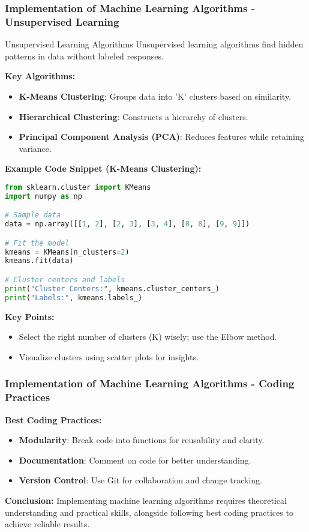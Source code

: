 \documentclass[aspectratio=169]{beamer}
\begin{document}
\begin{frame}[fragile]
    \frametitle{Implementation of Machine Learning Algorithms - Unsupervised Learning}
    \begin{block}{Unsupervised Learning Algorithms}
        Unsupervised learning algorithms find hidden patterns in data without labeled responses.
    \end{block}
    
    \textbf{Key Algorithms:}
    \begin{itemize}
        \item \textbf{K-Means Clustering}: Groups data into 'K' clusters based on similarity.
        \item \textbf{Hierarchical Clustering}: Constructs a hierarchy of clusters.
        \item \textbf{Principal Component Analysis (PCA)}: Reduces features while retaining variance.
    \end{itemize}
    
    \textbf{Example Code Snippet (K-Means Clustering):}
    \begin{lstlisting}[language=Python]
from sklearn.cluster import KMeans
import numpy as np

# Sample data
data = np.array([[1, 2], [2, 3], [3, 4], [8, 8], [9, 9]])

# Fit the model
kmeans = KMeans(n_clusters=2)
kmeans.fit(data)

# Cluster centers and labels
print("Cluster Centers:", kmeans.cluster_centers_)
print("Labels:", kmeans.labels_)
    \end{lstlisting}

    \textbf{Key Points:}
    \begin{itemize}
        \item Select the right number of clusters (K) wisely; use the Elbow method.
        \item Visualize clusters using scatter plots for insights.
    \end{itemize}
\end{frame}

\begin{frame}[fragile]
    \frametitle{Implementation of Machine Learning Algorithms - Coding Practices}
    \textbf{Best Coding Practices:}
    \begin{itemize}
        \item \textbf{Modularity}: Break code into functions for reusability and clarity.
        \item \textbf{Documentation}: Comment on code for better understanding.
        \item \textbf{Version Control}: Use Git for collaboration and change tracking.
    \end{itemize}
    
    \textbf{Conclusion:}
    Implementing machine learning algorithms requires theoretical understanding and practical skills, alongside following best coding practices to achieve reliable results.
\end{frame}
\end{document}
